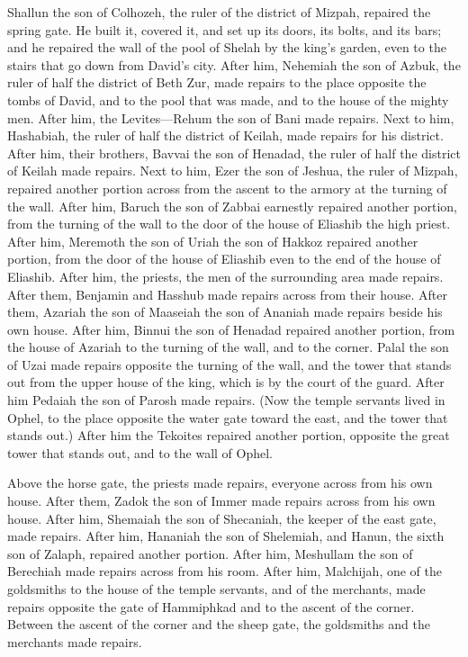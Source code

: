  Shallun the son of Colhozeh, the ruler of the district of
Mizpah, repaired the spring gate. He built it, covered it, and set up
its doors, its bolts, and its bars; and he repaired the wall of the pool
of Shelah by the king's garden, even to the stairs that go down from
David's city.  After him, Nehemiah the son of Azbuk, the
ruler of half the district of Beth Zur, made repairs to the place
opposite the tombs of David, and to the pool that was made, and to the
house of the mighty men.  After him, the Levites---Rehum
the son of Bani made repairs. Next to him, Hashabiah, the ruler of half
the district of Keilah, made repairs for his district. 
After him, their brothers, Bavvai the son of Henadad, the ruler of half
the district of Keilah made repairs.  Next to him, Ezer the
son of Jeshua, the ruler of Mizpah, repaired another portion across from
the ascent to the armory at the turning of the wall.  After
him, Baruch the son of Zabbai earnestly repaired another portion, from
the turning of the wall to the door of the house of Eliashib the high
priest.  After him, Meremoth the son of Uriah the son of
Hakkoz repaired another portion, from the door of the house of Eliashib
even to the end of the house of Eliashib.  After him, the
priests, the men of the surrounding area made repairs. 
After them, Benjamin and Hasshub made repairs across from their house.
After them, Azariah the son of Maaseiah the son of Ananiah made repairs
beside his own house.  After him, Binnui the son of Henadad
repaired another portion, from the house of Azariah to the turning of
the wall, and to the corner.  Palal the son of Uzai made
repairs opposite the turning of the wall, and the tower that stands out
from the upper house of the king, which is by the court of the guard.
After him Pedaiah the son of Parosh made repairs.  (Now the
temple servants lived in Ophel, to the place opposite the water gate
toward the east, and the tower that stands out.)  After him
the Tekoites repaired another portion, opposite the great tower that
stands out, and to the wall of Ophel.

 Above the horse gate, the priests made repairs, everyone
across from his own house.  After them, Zadok the son of
Immer made repairs across from his own house. After him, Shemaiah the
son of Shecaniah, the keeper of the east gate, made repairs.
 After him, Hananiah the son of Shelemiah, and Hanun, the
sixth son of Zalaph, repaired another portion. After him, Meshullam the
son of Berechiah made repairs across from his room.  After
him, Malchijah, one of the goldsmiths to the house of the temple
servants, and of the merchants, made repairs opposite the gate of
Hammiphkad and to the ascent of the corner.  Between the
ascent of the corner and the sheep gate, the goldsmiths and the
merchants made repairs.


